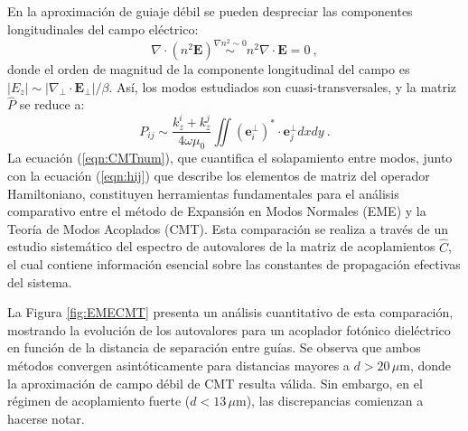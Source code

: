 En la aproximación de guiaje débil se pueden despreciar las componentes longitudinales del campo eléctrico:
\[ \nabla \cdot (n^2 \textbf{E}) \overset{\nabla n^2 \sim 0}{\sim} n^2 \nabla \cdot \textbf{E} = 0 \ ,\]
donde el orden de magnitud de la componente longitudinal del campo es $|E_z| \sim |\nabla_\perp \cdot \textbf{E}_\perp|/\beta$. Así, los modos estudiados son cuasi-transversales, y la matriz $\hat{P}$ se reduce a:
\begin{equation}
    P_{ij} \sim \frac{k_z^i + k_z^j}{4\omega\mu_0} \iint \left(\textbf{e}_i^\perp\right)^* \cdot \textbf{e}_j^\perp dxdy \ .
    \label{eqn:CMTnum}
\end{equation}
La ecuación (\ref{eqn:CMTnum}), que cuantifica el solapamiento entre modos, junto con la ecuación (\ref{eqn:hij}) que describe los elementos de matriz del operador Hamiltoniano, constituyen herramientas fundamentales para el análisis comparativo entre el método de Expansión en Modos Normales (EME) y la Teoría de Modos Acoplados (CMT). Esta comparación se realiza a través de un estudio sistemático del espectro de autovalores de la matriz de acoplamientos $\hat{C}$, el cual contiene información esencial sobre las constantes de propagación efectivas del sistema. 

La Figura \ref{fig:EMECMT} presenta un análisis cuantitativo de esta comparación, mostrando la evolución de los autovalores para un acoplador fotónico dieléctrico en función de la distancia de separación entre guías. Se observa que ambos métodos convergen asintóticamente para distancias mayores a $d > 20\,\mu$m, donde la aproximación de campo débil de CMT resulta válida. Sin embargo, en el régimen de acoplamiento fuerte ($d < 13\,\mu$m), las discrepancias comienzan a hacerse notar.

